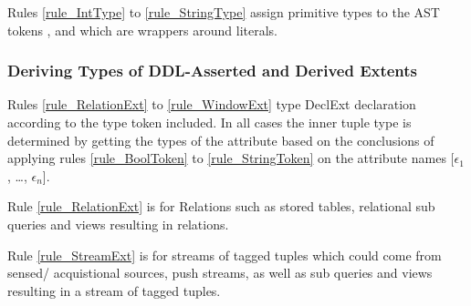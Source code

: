 
Rules \ref{rule_IntType} to \ref{rule_StringType} assign primitive types to the AST tokens ,  and  which are wrappers around literals.




\subsubsection{Deriving Types of DDL-Asserted and Derived Extents}
Rules \ref{rule_RelationExt} to \ref{rule_WindowExt} type DeclExt declaration according to the type token included.
In all cases the inner tuple type is determined by getting the types of the attribute based on the conclusions of applying rules \ref{rule_BoolToken} to \ref{rule_StringToken} on the attribute names [$\epsilon_1$,
  \mdots, $\epsilon_n$].

Rule \ref{rule_RelationExt} is for Relations such as stored tables, relational sub queries and views resulting in relations.

Rule \ref{rule_StreamExt} is for streams of tagged tuples which could come from sensed/ acquistional sources, push streams, as well as sub queries and views resulting in a stream of tagged tuples.

